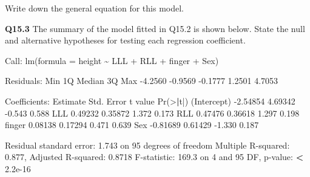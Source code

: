 \documentclass[
  oneside]{krantz}
\newenvironment{Shaded}{\begin{snugshade}}{\end{snugshade}}
\newcommand{\AttributeTok}[1]{\textcolor[rgb]{0.77,0.63,0.00}{#1}}
\newcommand{\DecValTok}[1]{\textcolor[rgb]{0.00,0.00,0.81}{#1}}
\newcommand{\ErrorTok}[1]{\textcolor[rgb]{0.64,0.00,0.00}{\textbf{#1}}}
\newcommand{\FloatTok}[1]{\textcolor[rgb]{0.00,0.00,0.81}{#1}}
\newcommand{\FunctionTok}[1]{\textcolor[rgb]{0.00,0.00,0.00}{#1}}
\newcommand{\NormalTok}[1]{#1}
\newcommand{\SpecialCharTok}[1]{\textcolor[rgb]{0.00,0.00,0.00}{#1}}
\begin{document}
Write down the general equation for this model.

\textbf{Q15.3} The summary of the model fitted in Q15.2 is shown below. State the null and alternative hypotheses for testing each regression coefficient.

\begin{Shaded}
\begin{Highlighting}[]
\NormalTok{Call}\SpecialCharTok{:}
\FunctionTok{lm}\NormalTok{(}\AttributeTok{formula =}\NormalTok{ height }\SpecialCharTok{\textasciitilde{}}\NormalTok{ LLL }\SpecialCharTok{+}\NormalTok{ RLL }\SpecialCharTok{+}\NormalTok{ finger }\SpecialCharTok{+}\NormalTok{ Sex)}

\NormalTok{Residuals}\SpecialCharTok{:}
\NormalTok{    Min      1Q  Median      3Q     Max }
\SpecialCharTok{{-}}\FloatTok{4.2560} \SpecialCharTok{{-}}\FloatTok{0.9569} \SpecialCharTok{{-}}\FloatTok{0.1777}  \FloatTok{1.2501}  \FloatTok{4.7053} 

\NormalTok{Coefficients}\SpecialCharTok{:}
\NormalTok{            Estimate Std. Error t value }\FunctionTok{Pr}\NormalTok{(}\SpecialCharTok{\textgreater{}}\ErrorTok{|}\NormalTok{t}\SpecialCharTok{|}\NormalTok{)}
\NormalTok{(Intercept) }\SpecialCharTok{{-}}\FloatTok{2.54854}    \FloatTok{4.69342}  \SpecialCharTok{{-}}\FloatTok{0.543}    \FloatTok{0.588}
\NormalTok{LLL          }\FloatTok{0.49232}    \FloatTok{0.35872}   \FloatTok{1.372}    \FloatTok{0.173}
\NormalTok{RLL          }\FloatTok{0.47476}    \FloatTok{0.36618}   \FloatTok{1.297}    \FloatTok{0.198}
\NormalTok{finger       }\FloatTok{0.08138}    \FloatTok{0.17294}   \FloatTok{0.471}    \FloatTok{0.639}
\NormalTok{Sex         }\SpecialCharTok{{-}}\FloatTok{0.81689}    \FloatTok{0.61429}  \SpecialCharTok{{-}}\FloatTok{1.330}    \FloatTok{0.187}

\NormalTok{Residual standard error}\SpecialCharTok{:} \FloatTok{1.743}\NormalTok{ on }\DecValTok{95}\NormalTok{ degrees of freedom}
\NormalTok{Multiple R}\SpecialCharTok{{-}}\NormalTok{squared}\SpecialCharTok{:}  \FloatTok{0.877}\NormalTok{,     Adjusted R}\SpecialCharTok{{-}}\NormalTok{squared}\SpecialCharTok{:}  \FloatTok{0.8718} 
\NormalTok{F}\SpecialCharTok{{-}}\NormalTok{statistic}\SpecialCharTok{:} \FloatTok{169.3}\NormalTok{ on }\DecValTok{4}\NormalTok{ and }\DecValTok{95}\NormalTok{ DF,  p}\SpecialCharTok{{-}}\NormalTok{value}\SpecialCharTok{:} \ErrorTok{\textless{}} \FloatTok{2.2e{-}16}
\end{Highlighting}
\end{Shaded}
\end{document}
